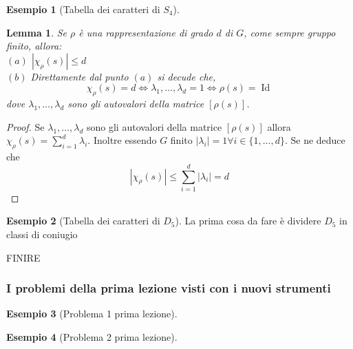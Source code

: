 \documentclass[11pt]{article}
\theoremstyle{plain}
\newtheorem{lemma}[thm]{Lemma}
\theoremstyle{definition}
\newtheorem{exmp}{Esempio}[section]
\theoremstyle{remark}
\DeclareMathOperator{\Id}{Id}
\begin{document}
\begin{exmp}[Tabella dei caratteri di $S_4$]
\begin{lemma}
Se $\rho$ è una rappresentazione di grado $d$ di $G$, come sempre gruppo finito, allora:\\
$(a)$ $|\chi_{\rho}(s)|\leq d$ \\
$(b)$ Direttamente dal punto $(a)$ si decude che,
\[
\chi_{\rho}(s)=d\Leftrightarrow \lambda_1,\ldots,\lambda_d=1\Leftrightarrow \rho(s)=\Id
\]
dove $\lambda_1,\ldots,\lambda_d$ sono gli autovalori della matrice $[\rho(s)]$.
\end{lemma}

\begin{proof}
 Se $\lambda_1,\ldots,\lambda_d$ sono gli autovalori della matrice $[\rho(s)]$ allora $\chi_{\rho}(s)=\sum_{i=1}^{d}\lambda_i$. Inoltre essendo $G$ finito $|\lambda_i|=1\forall i\in \{1,\ldots,d\}$. Se ne deduce che
\[
|\chi_{\rho}(s)|\leq \sum_{i=1}^d |\lambda_i|=d
\]
\end{proof}


\end{exmp}





\begin{exmp}[Tabella dei caratteri di $D_5$]

La prima cosa da fare è dividere $D_5$ in classi di coniugio


FINIRE

\end{exmp}



\subsubsection{I problemi della prima lezione visti con i nuovi strumenti}
\begin{exmp}[Problema 1 prima lezione]


\end{exmp}

\begin{exmp}[Problema 2 prima lezione]


\end{exmp}
\end{document}
